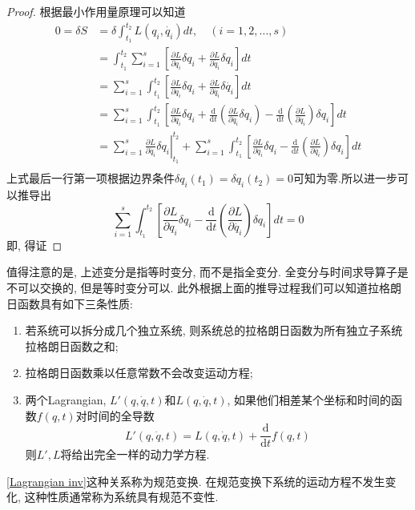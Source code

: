 \documentclass[a4paper,11pt]{book}
\newtheorem{proof}{证明}[section]
\begin{document}
\begin{proof}
  根据最小作用量原理可以知道
  \begin{equation*}
    \begin{split}
       0=\delta S &= \delta\int_{t_1}^{t_2}L(q_i,\dot{q_i})dt,\quad (i=1,2,\dots,s) \\
         & =\int_{t_1}^{t_2}\sum_{i=1}^{s}\left[\frac{\partial L}{\partial{q_i}}\delta q_i+\frac{\partial{L}}{\partial{\dot{q_i}}}\delta q_i\right]dt \\
         & =\sum_{i=1}^{s}\int_{t_1}^{t_2}\left[\frac{\partial L}{\partial{q_i}}\delta q_i+\frac{\partial L}{\partial{\dot{q_i}}}\delta\dot{q_i}\right]dt \\
         & =\sum_{i=1}^{s}\int_{t_1}^{t_2}\left[\frac{\partial L}{\partial{q_i}}\delta q_i+\frac{\mathrm{d}}{\mathrm{d}t}\left(\frac{\partial L}{\partial{\dot{q_i}}}\delta q_i\right)-\frac{\mathrm{d}}{\mathrm{d}t}\left(\frac{\partial L}{\partial{\dot{q_i}}}\right)\delta q_i\right]dt \\
         & \left.=\sum_{i=1}^{s}\frac{\partial L}{\partial{\dot{q_i}}}\delta q_i\right|^{t_2}_{t_1}+\sum_{i=1}^{s}\int_{t_1}^{t_2}\left[\frac{\partial L}{\partial{q_i}}\delta q_i-\frac{\mathrm{d}}{\mathrm{d}t}\left(\frac{\partial L}{\partial{\dot{q_i}}}\right)\delta q_i\right]dt \\
    \end{split}
  \end{equation*}
  上式最后一行第一项根据边界条件$\delta q_i(t_1)=\delta q_i(t_2)=0$可知为零.所以进一步可以推导出
  \begin{equation*}
    \sum_{i=1}^{s}\int_{t_1}^{t_2}\left[\frac{\partial L}{\partial{q_i}}\delta q_i-\frac{\mathrm{d}}{\mathrm{d}t}\left(\frac{\partial L}{\partial{\dot{q_i}}}\right)\delta q_i\right]dt=0
  \end{equation*}
  即, 得证
\end{proof}
值得注意的是, 上述变分是指等时变分, 而不是指全变分. 全变分与时间求导算子是不可以交换的, 但是等时变分可以. 此外根据上面的推导过程我们可以知道拉格朗日函数具有如下三条性质:
\begin{enumerate}[(1)]
  \item 若系统可以拆分成几个独立系统, 则系统总的拉格朗日函数为所有独立子系统拉格朗日函数之和;
  \item 拉格朗日函数乘以任意常数不会改变运动方程;
  \item\label{Lagrangian inv} 两个Lagrangian, $L'(q,\dot{q},t)$和$L(q,\dot{q},t)$, 如果他们相差某个坐标和时间的函数$f(q,t)$对时间的全导数
  \begin{equation*}
    L'(q,\dot{q},t)=L(q,\dot{q},t)+\frac{\mathrm{d}}{\mathrm{d}t}f(q,t)
  \end{equation*}
  则$L',L$将给出完全一样的动力学方程.
\end{enumerate}
\ref{Lagrangian inv}这种关系称为规范变换. 在规范变换下系统的运动方程不发生变化, 这种性质通常称为系统具有规范不变性.
\end{document}
